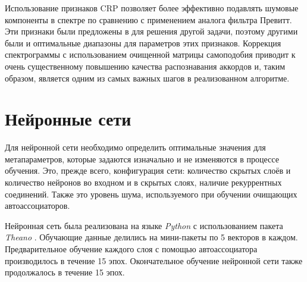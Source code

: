 \medskip

Использование признаков CRP позволяет более эффективно подавлять шумовые
компоненты в спектре по сравнению с применением аналога фильтра Превитт. Эти
признаки были предложены в \cite{Mueller2009} для решения другой задачи, поэтому
другими были и оптимальные диапазоны для параметров этих признаков. Коррекция
спектрограммы с использованием очищенной матрицы самоподобия приводит к очень
существенному повышению качества распознавания аккордов и, таким образом,
является одним из самых важных шагов в реализованном алгоритме.


\section{Нейронные сети} \label{sect3_nn}

Для нейронной сети необходимо определить оптимальные значения для
метапараметров, которые задаются изначально и не изменяются в процессе обучения.
Это, прежде всего, конфигурация сети: количество скрытых слоёв и количество
нейронов во входном и в скрытых слоях, наличие рекуррентных соединений. Также
это уровень шума, используемого при обучении очищающих автоассоциаторов.

Нейронная сеть была реализована на языке \emph{Python} с использованием пакета
\emph{Theano} \cite{Bergstra2010}. Обучающие данные делились на мини-пакеты по 5
векторов в каждом. Предварительное обучение каждого слоя с помощью
автоассоциатора производилось в течение 15 эпох. Окончательное обучение
нейронной сети также продолжалось в течение 15 эпох.

